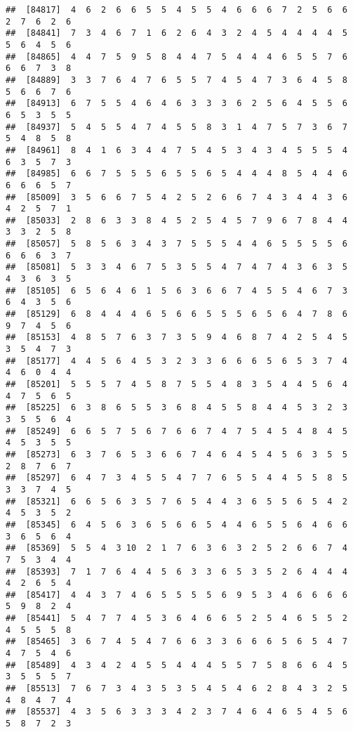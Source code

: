 \documentclass[
]{book}
\begin{document}
\begin{verbatim}
##  [84817]  4  6  2  6  6  5  5  4  5  5  4  6  6  6  7  2  5  6  6  2  7  6  2  6
##  [84841]  7  3  4  6  7  1  6  2  6  4  3  2  4  5  4  4  4  4  5  5  6  4  5  6
##  [84865]  4  4  7  5  9  5  8  4  4  7  5  4  4  4  6  5  5  7  6  6  6  7  3  8
##  [84889]  3  3  7  6  4  7  6  5  5  7  4  5  4  7  3  6  4  5  8  5  6  6  7  6
##  [84913]  6  7  5  5  4  6  4  6  3  3  3  6  2  5  6  4  5  5  6  6  5  3  5  5
##  [84937]  5  4  5  5  4  7  4  5  5  8  3  1  4  7  5  7  3  6  7  5  4  8  5  8
##  [84961]  8  4  1  6  3  4  4  7  5  4  5  3  4  3  4  5  5  5  4  6  3  5  7  3
##  [84985]  6  6  7  5  5  5  6  5  5  6  5  4  4  4  8  5  4  4  6  6  6  6  5  7
##  [85009]  3  5  6  6  7  5  4  2  5  2  6  6  7  4  3  4  4  3  6  4  2  5  7  1
##  [85033]  2  8  6  3  3  8  4  5  2  5  4  5  7  9  6  7  8  4  4  3  3  2  5  8
##  [85057]  5  8  5  6  3  4  3  7  5  5  5  4  4  6  5  5  5  5  6  6  6  6  3  7
##  [85081]  5  3  3  4  6  7  5  3  5  5  4  7  4  7  4  3  6  3  5  4  3  6  3  5
##  [85105]  6  5  6  4  6  1  5  6  3  6  6  7  4  5  5  4  6  7  3  6  4  3  5  6
##  [85129]  6  8  4  4  4  6  5  6  6  5  5  5  6  5  6  4  7  8  6  9  7  4  5  6
##  [85153]  4  8  5  7  6  3  7  3  5  9  4  6  8  7  4  2  5  4  5  3  5  4  7  3
##  [85177]  4  4  5  6  4  5  3  2  3  3  6  6  6  5  6  5  3  7  4  4  6  0  4  4
##  [85201]  5  5  5  7  4  5  8  7  5  5  4  8  3  5  4  4  5  6  4  4  7  5  6  5
##  [85225]  6  3  8  6  5  5  3  6  8  4  5  5  8  4  4  5  3  2  3  3  5  5  6  4
##  [85249]  6  6  5  7  5  6  7  6  6  7  4  7  5  4  5  4  8  4  5  4  5  3  5  5
##  [85273]  6  3  7  6  5  3  6  6  7  4  6  4  5  4  5  6  3  5  5  2  8  7  6  7
##  [85297]  6  4  7  3  4  5  5  4  7  7  6  5  5  4  4  5  5  8  5  3  3  7  4  5
##  [85321]  6  6  5  6  3  5  7  6  5  4  4  3  6  5  5  6  5  4  2  4  5  3  5  2
##  [85345]  6  4  5  6  3  6  5  6  6  5  4  4  6  5  5  6  4  6  6  3  6  5  6  4
##  [85369]  5  5  4  3 10  2  1  7  6  3  6  3  2  5  2  6  6  7  4  7  5  3  4  4
##  [85393]  7  1  7  6  4  4  5  6  3  3  6  5  3  5  2  6  4  4  4  4  2  6  5  4
##  [85417]  4  4  3  7  4  6  5  5  5  5  6  9  5  3  4  6  6  6  6  5  9  8  2  4
##  [85441]  5  4  7  7  4  5  3  6  4  6  6  5  2  5  4  6  5  5  2  4  5  5  5  8
##  [85465]  3  6  7  4  5  4  7  6  6  3  3  6  6  6  5  6  5  4  7  4  7  5  4  6
##  [85489]  4  3  4  2  4  5  5  4  4  4  5  5  7  5  8  6  6  4  5  3  5  5  5  7
##  [85513]  7  6  7  3  4  3  5  3  5  4  5  4  6  2  8  4  3  2  5  4  8  4  7  4
##  [85537]  4  3  5  6  3  3  3  4  2  3  7  4  6  4  6  5  4  5  6  5  8  7  2  3

\end{verbatim}
\end{document}
